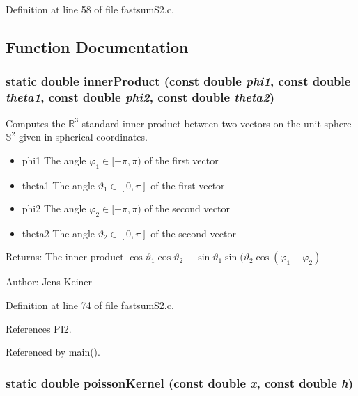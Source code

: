 Definition at line 58 of file fastsumS2.c.

\subsection{Function Documentation}
\hypertarget{group__applications__fastsumS2__test_g764f956ac40df99e776155bfa8da2e93}{
\subsubsection{\setlength{\rightskip}{0pt plus 5cm}static double innerProduct (const double {\em phi1}, const double {\em theta1}, const double {\em phi2}, const double {\em theta2})}}
\label{group__applications__fastsumS2__test_g764f956ac40df99e776155bfa8da2e93}


Computes the $\mathbb{R}^3$ standard inner product between two vectors on the unit sphere $\mathbb{S}^2$ given in spherical coordinates. 

\begin{itemize}
\item phi1 The angle $\varphi_1 \in [-\pi,\pi)$ of the first vector \item theta1 The angle $\vartheta_1 \in [0,\pi]$ of the first vector \item phi2 The angle $\varphi_2 \in [-\pi,\pi)$ of the second vector \item theta2 The angle $\vartheta_2 \in [0,\pi]$ of the second vector\end{itemize}
\begin{Desc}
\item[Returns:]The inner product $\cos \vartheta_1 \cos \vartheta_2 + \sin \vartheta_1 \sin(\vartheta_2 \cos(\varphi_1 - \varphi_2)$\end{Desc}
\begin{Desc}
\item[Author:]Jens Keiner \end{Desc}


Definition at line 74 of file fastsumS2.c.

References PI2.

Referenced by main().\hypertarget{group__applications__fastsumS2__test_g6db9bf5c4ee6ca573d6d08a8202a5314}{
\subsubsection{\setlength{\rightskip}{0pt plus 5cm}static double poissonKernel (const double {\em x}, const double {\em h})}}
\label{group__applications__fastsumS2__test_g6db9bf5c4ee6ca573d6d08a8202a5314}


